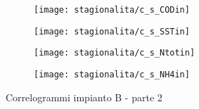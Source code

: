 \begin{sidewaysfigure}[h]\ContinuedFloat
	\renewcommand*\thesubfigure{(\arabic{subfigure})}
	\begin{subfigure}{0.49\textwidth}
		\texttt{[image: stagionalita/c\_s\_CODin]}
		\caption{}
		\centering
	\end{subfigure}
	\begin{subfigure}{0.49\textwidth}
		\texttt{[image: stagionalita/c\_s\_SSTin]}
		\caption{}
		\centering
	\end{subfigure}

	\begin{subfigure}{0.49\textwidth}
		\texttt{[image: stagionalita/c\_s\_Ntotin]}
		\caption{}
		\centering
	\end{subfigure}
	\begin{subfigure}{0.49\textwidth}
		\texttt{[image: stagionalita/c\_s\_NH4in]}	
		\caption{}
		\centering
	\end{subfigure}
	\caption{Correlogrammi impianto B - parte 2}
\end{sidewaysfigure}

